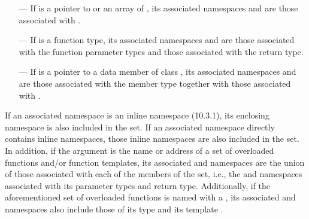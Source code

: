 \begin{std.txt}
\begin{itemize}
  \item[---] If  is a pointer to  or an array
  of , its associated namespaces
  and   are those associated
  with . 

  \item[---] If  is a function type, its associated
  namespaces and   are those
  associated with the function parameter types and those associated
  with the return type.

  \item[---] If  is a pointer to a data member of
  class , its associated namespaces
  and   are those associated with the
  member type together with those associated with .
  \end{itemize}

  If an associated namespace is an inline namespace (10.3.1), its
  enclosing namespace is also included in the set.  If an associated
  namespace directly contains inline namespaces, those inline
  namespaces are also included in the set.  In addition, if the
  argument is the name or address of a set of overloaded functions
  and/or function templates, its
  associated   and namespaces are the
  union of those associated with each of the members of the set, i.e.,
  the   and namespaces associated
  with its parameter types and return type.  Additionally, if the
  aforementioned set of overloaded functions is named with
  a , its
  associated   and namespaces also
  include those of its type  and its
  template .
\end{std.txt}

